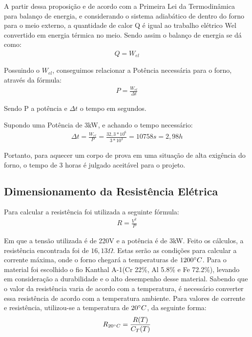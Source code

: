 A partir dessa proposição e de acordo com a Primeira Lei da Termodinâmica para balanço de energia, e considerando o sistema adiabático de dentro do forno para o meio externo, a quantidade de calor Q é igual ao trabalho elétrico Wel convertido em energia térmica no meio. Sendo assim o balanço de energia se dá como:
\begin{gather}
    Q = W_{el}
\end{gather}

Possuindo o $W_{el}$, conseguimos relacionar a Potência necessária para o forno, através da fórmula:
\begin{gather}
    P = \frac{W_{el}}{\Delta t}
\end{gather}

Sendo P a potência e $\Delta t$ o tempo em segundos.

Supondo uma Potência de 3kW, e achando o tempo necessário:
\begin{gather}
    \Delta t = \frac{W_{el}}{P} = \frac{32,3*10^6}{3*10^3} = 10758s = 2,98h \nonumber
\end{gather}

Portanto, para aquecer um corpo de prova em uma situação de alta exigência do forno, o tempo de 3 horas é julgado aceitável para o projeto.

\subsection{Dimensionamento da Resistência Elétrica}
Para calcular a resistência foi utilizada a seguinte fórmula:
\begin{gather}
    R = \frac{V^2}{P}
\end{gather}

Em que a tensão utilizada é de 220V e a potência é de 3kW. Feito os cálculos, a resistência encontrada foi de $16,13 \Omega$. Estas serão as condições para calcular a corrente máxima, onde o forno chegará a temperaturas de $1200 \degree C$. Para o material foi escolhido o fio Kanthal A-1(Cr 22\%, Al 5.8\% e Fe 72.2\%), levando em consideração a durabilidade e o alto desempenho desse material. Sabendo que o valor da resistência varia de acordo com a temperatura, é necessário converter essa resistência de acordo com a temperatura ambiente. Para valores de corrente e resistência, utilizou-se a temperatura de $20 \degree C$, da seguinte forma:
\begin{gather}
    R_{20 \degree C} = \frac{R(T)}{C_T(T)}
\end{gather}


